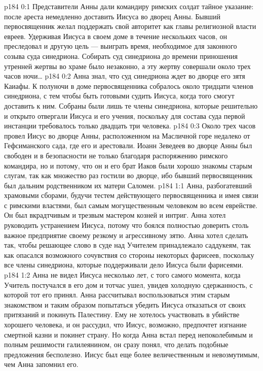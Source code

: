 \vs p184 0:1 Представители Анны дали командиру римских солдат тайное указание: после ареста немедленно доставить Иисуса во дворец Анны. Бывший первосвященник желал поддержать свой авторитет как главы религиозной власти евреев. Удерживая Иисуса в своем доме в течение нескольких часов, он преследовал и другую цель --- выиграть время, необходимое для законного созыва суда синедриона. Собирать суд синедриона до времени приношения утренней жертвы во храме было незаконно, а эту жертву совершали около трех часов ночи\ldots
\vs p184 0:2 Анна знал, что суд синедриона ждет во дворце его зятя Каиафы. К полуночи в доме первосвященника собралось около тридцати членов синедриона, с тем чтобы быть готовыми судить Иисуса, когда того смогут доставить к ним. Собраны были лишь те члены синедриона, которые решительно и открыто отвергали Иисуса и его учения, поскольку для состава суда первой инстанции требовалось только двадцать три человека.
\vs p184 0:3 Около трех часов провел Иисус во дворце Анны, расположенном на Масличной горе недалеко от Гефсиманского сада, где его и арестовали. Иоанн Зеведеев во дворце Анны был свободен и в безопасности не только благодаря распоряжению римского командира, но и потому, что он и его брат Иаков были хорошо знакомы старым слугам, так как множество раз гостили во дворце, ибо бывший первосвященник был дальним родственником их матери Саломеи.
\vs p184 1:1 Анна, разбогатевший храмовыми сборами, будучи тестем действующего первосвященника и имея связи с римскими властями, был самым могущественным человеком во всем еврействе. Он был вкрадтчивым и трезвым мастером козней и интриг. Анна хотел руководить устранением Иисуса, потому что боялся полностью доверить столь важное предприятие своему резкому и агрессивному зятю. Анна хотел сделать так, чтобы решающее слово в суде над Учителем принадлежало саддукеям, так как опасался возможного сочувствия со стороны некоторых фарисеев, поскольку все члены синедриона, которые поддерживали дело Иисуса были фарисеями.
\vs p184 1:2 Анна не видел Иисуса несколько лет, с того самого момента, когда Учитель постучался в его дом и тотчас ушел, увидев холодную сдержанность, с которой тот его принял. Анна рассчитывал воспользоваться этим старым знакомством и таким образом попытаться убедить Иисуса отказаться от своих притязаний и покинуть Палестину. Ему не хотелось участвовать в убийстве хорошего человека, и он рассудил, что Иисус, возможно, предпочтет изгнание смертной казни и покинет страну. Но когда Анна встал перед непоколебимым и полным решимости галилеянином, он сразу понял, что делать подобные предложения бесполезно. Иисус был еще более величественным и невозмутимым, чем Анна запомнил его.
